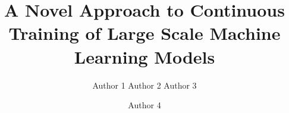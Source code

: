 \documentclass{sig-alternate-05-2015}
\begin{document}








%

\title{A Novel Approach to Continuous Training of Large Scale Machine Learning Models}

%
%
%
%
%

%
\author{
%
%
\alignauthor
Author 1
\alignauthor
Author 2
\alignauthor Author 3
\and  %
\alignauthor Author 4
}
\end{document}
